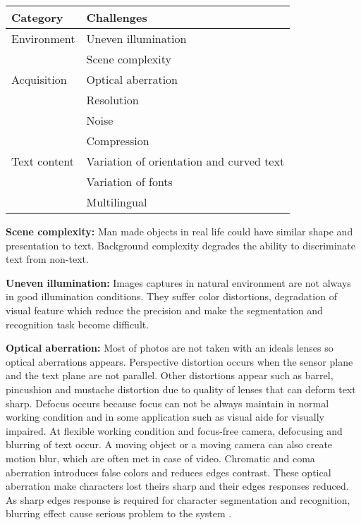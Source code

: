 \begin{center} \label{Chalenges}
\begin{tabular}{|l|l|}
\hline 
\textbf{Category} &\textbf{Challenges} \\ 
\hline 
Environment &Uneven illumination \\ 
	\cline{2-2} 
 	&Scene complexity \\ 
\hline 
Acquisition &Optical aberration \\ 
 	\cline{2-2} 
	 &Resolution \\  	
 	\cline{2-2} 
	 &Noise \\ 	 
 	\cline{2-2} 
	 &Compression \\ 	 
\hline 
Text content &Variation of orientation and curved text \\ 
	\cline{2-2}  
	 &Variation of fonts \\ 
	\cline{2-2} 
 	&Multilingual\\ 
\hline 
\end{tabular} 
\end{center}


\textbf{Scene complexity:} Man made objects in real life could have similar shape and presentation to text. Background complexity degrades the ability to discriminate text from non-text.

\textbf{Uneven illumination:} Images captures in natural environment are not always in good illumination conditions. They suffer color distortions, degradation of visual feature which reduce the precision and make the segmentation and recognition task become difficult.

\textbf{Optical aberration: } Most of photos are not taken with an ideals lenses so optical aberrations appears. Perspective distortion occurs when the sensor plane and the text plane are not parallel. Other distortions appear such as barrel, pincushion and mustache distortion due to quality of lenses that can deform text sharp. Defocus occurs because focus can not be always maintain in normal working condition and in some application such as visual aide for visually impaired. At flexible working condition and focus-free camera, defocusing and blurring of text occur. A moving object or a moving camera can also create motion blur, which are often met in case of video. Chromatic and coma aberration introduces false colors and reduces edges contrast. These optical aberration make characters lost theirs sharp and their edges responses reduced. As sharp edges response is required for character segmentation and recognition, blurring effect cause serious problem to the system \cite{Liang.2005.IJDAR}.

